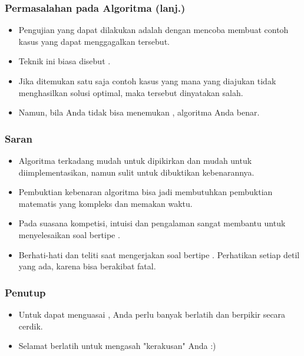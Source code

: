 \begin{frame}
  \frametitle{Permasalahan pada Algoritma \fGreedy (lanj.)}
  \begin{itemize}
    \item Pengujian yang dapat dilakukan adalah dengan mencoba membuat contoh kasus yang dapat menggagalkan \fgreedyChoice tersebut.
    \item Teknik ini biasa disebut .
    \item Jika ditemukan satu saja contoh kasus yang mana \fgreedyChoice yang diajukan tidak menghasilkan solusi optimal, maka \fgreedyChoice tersebut dinyatakan salah.
    \item Namun, bila Anda tidak bisa menemukan ,  algoritma Anda benar.
  \end{itemize}
\end{frame}

\begin{frame}
\frametitle{Saran}
  \begin{itemize}
    \item Algoritma \fgreedy terkadang mudah untuk dipikirkan dan mudah untuk diimplementasikan, namun sulit untuk dibuktikan kebenarannya.
    \item Pembuktian kebenaran algoritma \fgreedy bisa jadi membutuhkan pembuktian matematis yang kompleks dan memakan waktu.
    \item Pada suasana kompetisi, intuisi dan pengalaman sangat membantu untuk menyelesaikan soal bertipe \fgreedy.
    \item Berhati-hati dan teliti saat mengerjakan soal bertipe \fgreedy. Perhatikan setiap detil yang ada, karena  bisa berakibat fatal.
  \end{itemize}
\end{frame}

\begin{frame}
\frametitle{Penutup}
  \begin{itemize}
    \item Untuk dapat menguasai \fgreedy, Anda perlu banyak berlatih dan berpikir secara cerdik.
    \item Selamat berlatih untuk mengasah "kerakusan" Anda :)
  \end{itemize}
\end{frame}


